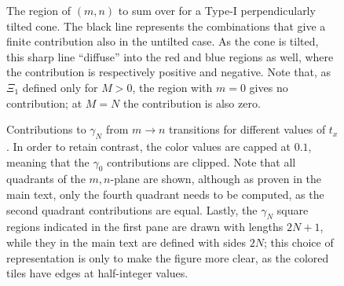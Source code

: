 \begin{figure}[ht]
  \centering
  \caption{The region of \( (m,n) \) to sum over for a Type-I perpendicularly tilted cone.
    The black line represents the combinations that give a finite contribution also in the untilted case.
    As the cone is tilted, this sharp line ``diffuse'' into the red and blue regions as well, where the contribution is respectively positive and negative.
    Note that, as \( \Xi_1 \) defined only for \( M>0\), the region with \( m=0 \) gives no contribution;
    at \( M=N \) the contribution is also zero.%
  }
  \label{fig:nmregion}
\end{figure}

\begin{figure}[htb]
  \centering
  
  \caption{Contributions to \( \gamma_N \) from \( m\to n \) transitions for different values of \( t_x \).
    In order to retain contrast, the color values are capped at \( 0.1 \), meaning that the \( \gamma_0 \) contributions are clipped.
    Note that all quadrants of the \( m,n \)-plane are shown, although as proven in the main text, only the fourth quadrant needs to be computed, as the second quadrant contributions are equal.
    Lastly, the \( \gamma_N \) square regions indicated in the first pane are drawn with lengths \( 2N + 1 \), while they in the main text are defined with sides \( 2N \);
    this choice of representation is only to make the figure more clear, as the colored tiles have edges at half-integer values.
    \label{fig:contribs}
    }
\end{figure}

